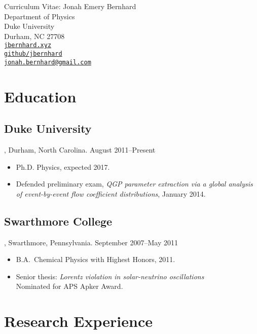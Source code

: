 \documentclass[letterpaper,10pt]{article}
\begin{document}
\begin{center}
  \Large
  Curriculum Vitae:  Jonah Emery Bernhard \\[1ex]
  \normalsize\rm
  Department of Physics \\
  Duke University \\
  Durham, NC 27708 \\[1ex]
  \href{http://jbernhard.xyz}{\nolinkurl{jbernhard.xyz}} \\
  \href{https://github.com/jbernhard}{\nolinkurl{github/jbernhard}} \\
  \href{mailto:jonah.bernhard@gmail.com}{\nolinkurl{jonah.bernhard@gmail.com}}
\end{center}


\section{Education}


\subsection{Duke University}, Durham, North Carolina. \hfill August 2011--Present

\begin{itemize}
  \item Ph.D. Physics, expected 2017.
  \item Defended preliminary exam, \emph{QGP parameter extraction via a global analysis of event-by-event flow coefficient distributions}, January 2014.
\end{itemize}


\subsection{Swarthmore College}, Swarthmore, Pennsylvania. \hfill September 2007--May 2011

\begin{itemize}
  \item B.A.\ Chemical Physics with Highest Honors, 2011.
  \item Senior thesis:  \emph{Lorentz violation in solar-neutrino oscillations} \\
          Nominated for APS Apker Award.
\end{itemize}



\section{Research Experience}
\end{document}
